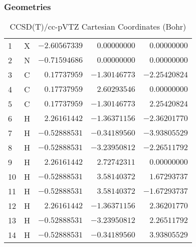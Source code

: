 \documentclass[10pt,oneside]{article}
\begin{document}
\subsubsection*{Geometries}
\begin{table}[h!]
\centering
\caption{CCSD(T)/cc-pVTZ Cartesian Coordinates (Bohr)}
\begin{tabular}{llrrr}
1  & X  & $-2.60567339$ & $ 0.00000000$ & $ 0.00000000$ \\
2  & N  & $-0.71594686$ & $ 0.00000000$ & $ 0.00000000$ \\
3  & C  & $ 0.17737959$ & $-1.30146773$ & $-2.25420824$ \\
4  & C  & $ 0.17737959$ & $ 2.60293546$ & $ 0.00000000$ \\
5  & C  & $ 0.17737959$ & $-1.30146773$ & $ 2.25420824$ \\
6  & H  & $ 2.26161442$ & $-1.36371156$ & $-2.36201770$ \\
7  & H  & $-0.52888531$ & $-0.34189560$ & $-3.93805529$ \\
8  & H  & $-0.52888531$ & $-3.23950812$ & $-2.26511792$ \\
9  & H  & $ 2.26161442$ & $ 2.72742311$ & $ 0.00000000$ \\
10 & H  & $-0.52888531$ & $ 3.58140372$ & $ 1.67293737$ \\
11 & H  & $-0.52888531$ & $ 3.58140372$ & $-1.67293737$ \\
12 & H  & $ 2.26161442$ & $-1.36371156$ & $ 2.36201770$ \\
13 & H  & $-0.52888531$ & $-3.23950812$ & $ 2.26511792$ \\
14 & H  & $-0.52888531$ & $-0.34189560$ & $ 3.93805529$ \\
\end{tabular}
\end{table}
\end{document}
